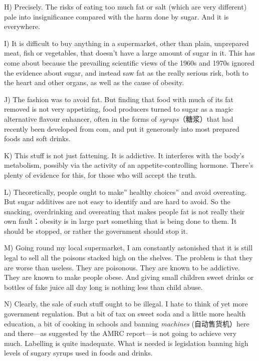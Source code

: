 \documentclass[UTF8,11pt]{ctexart}
\begin{document}
H) Precisely. The risks of eating too much fat or salt (which are very different) pale into insignificance compared with the harm done by sugar. And it is everywhere.


I) It is difficult to buy anything in a supermarket, other than plain, unprepared meat, fish or vegetables, that doesn’t have a large amount of sugar in it. This has come about because the prevailing scientific views of the 1960s and 1970s ignored the evidence about sugar, and instead saw fat as the really serious risk, both to the heart and other organs, as well as the cause of obesity.


J) The fashion was to avoid fat. But finding that food with much of its fat removed is not very appetizing, food producers turned to sugar as a magic alternative flavour enhancer, often in the forms of\textit{ syrups}（糖浆）that had recently been developed from com, and put it generously into most prepared foods and soft drinks.


K) This stuff is not just fattening. It is addictive. It interferes with the body’s metabolism, possibly via the activity of an appetite-controlling hormone. There’s plenty of evidence for this, for those who will accept the truth.


L) Theoretically, people ought to make” healthy choices” and avoid overeating. But sugar additives are not easy to identify and are hard to avoid. So the snacking, overdrinking and overeating that makes people fat is not really their own fault：obesity is in large part something that is being done to them. It should be stopped, or rather the government should stop it.


M) Going round my local supermarket, I am constantly astonished that it is still legal to sell all the poisons stacked high on the shelves. The problem is that they are worse than useless. They are poisonous. They are known to be addictive. They are known to make people obese. And giving small children sweet drinks or bottles of fake juice all day long is nothing less than child abuse.


N) Clearly, the sale of such stuff ought to be illegal. I hate to think of yet more government regulation. But a bit of tax on sweet soda and a little more health education, a bit of cooking in schools and banning\textit{ machines} (自动售货机）here and there—as suggested by the AMRC report—is not going to achieve very much. Labelling is quite inadequate. What is needed is legislation banning high levels of sugary syrups used in foods and drinks.
\end{document}
